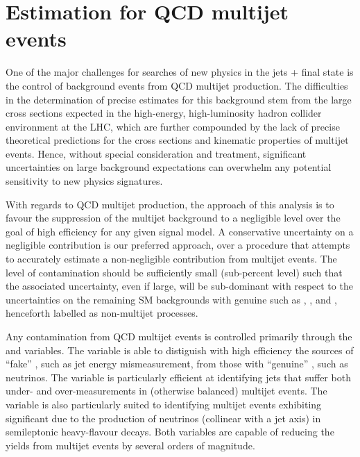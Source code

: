 
\section{Estimation for QCD multijet events \label{sec:qcd}}

One of the major challenges for searches of new physics in the jets +
\met final state is the control of background events from QCD multijet
production. The difficulties in the determination of precise estimates
for this background stem from the large cross sections expected in the
high-energy, high-luminosity hadron collider environment at the LHC,
which are further compounded by the lack of precise theoretical
predictions for the cross sections and kinematic properties of
multijet events. Hence, without special consideration and treatment,
significant uncertainties on large background expectations can
overwhelm any potential sensitivity to new physics signatures.

With regards to QCD multijet production, the approach of this analysis
is to favour the suppression of the multijet background to a
negligible level over the goal of high efficiency for any given signal
model. A conservative uncertainty on a negligible contribution is our
preferred approach, over a procedure that attempts to accurately
estimate a non-negligible contribution from multijet events. The level
of contamination should be sufficiently small (\ie sub-percent level)
such that the associated uncertainty, even if large, will be
sub-dominant with respect to the uncertainties on the remaining SM
backgrounds with genuine \met such as \wj, \znunu, and \ttbar,
henceforth labelled as non-multijet processes.

Any contamination from QCD multijet events is controlled primarily
through the \alphat and \bdphi variables. The \alphat variable is able
to distiguish with high efficiency the sources of ``fake'' \met, such
as jet energy mismeasurement, from those with ``genuine'' \met, such
as neutrinos. The \bdphi variable is particularly efficient at
identifying jets that suffer both under- and over-measurements in
(otherwise balanced) multijet events. The variable is also
particularly suited to identifying multijet events exhibiting
significant \met due to the production of neutrinos (collinear with a
jet axis) in semileptonic heavy-flavour decays. Both variables are
capable of reducing the yields from multijet events by several orders
of magnitude.

